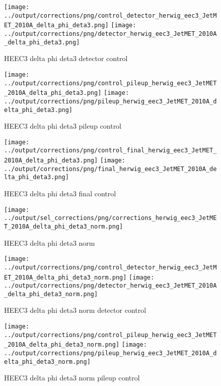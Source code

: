 \documentclass[11pt]{book}
\begin{document}
\begin{figure}[ht]
\centering
\texttt{[image: ../output/corrections/png/control\_detector\_herwig\_eec3\_JetMET\_2010A\_delta\_phi\_deta3.png]}
\texttt{[image: ../output/corrections/png/detector\_herwig\_eec3\_JetMET\_2010A\_delta\_phi\_deta3.png]}
\caption{HEEC3 delta phi deta3 detector control}
\label{fig:HEEC3_JetMET_2010A_delta_phi_deta3_detector_control}
\end{figure}

\begin{figure}[ht]
\centering
\texttt{[image: ../output/corrections/png/control\_pileup\_herwig\_eec3\_JetMET\_2010A\_delta\_phi\_deta3.png]}
\texttt{[image: ../output/corrections/png/pileup\_herwig\_eec3\_JetMET\_2010A\_delta\_phi\_deta3.png]}
\caption{HEEC3 delta phi deta3 pileup control}
\label{fig:HEEC3_JetMET_2010A_delta_phi_deta3_pileup_control}
\end{figure}


\begin{figure}[ht]
\centering
\texttt{[image: ../output/corrections/png/control\_final\_herwig\_eec3\_JetMET\_2010A\_delta\_phi\_deta3.png]}
\texttt{[image: ../output/corrections/png/final\_herwig\_eec3\_JetMET\_2010A\_delta\_phi\_deta3.png]}
\caption{HEEC3 delta phi deta3 final control}
\label{fig:HEEC3_JetMET_2010A_delta_phi_deta3_final_control}
\end{figure}


\begin{figure}[ht]
\centering
\texttt{[image: ../output/sel\_corrections/png/corrections\_herwig\_eec3\_JetMET\_2010A\_delta\_phi\_deta3\_norm.png]}
\caption{HEEC3 delta phi deta3 norm}
\label{fig:HEEC3_JetMET_2010A_delta_phi_deta3_norm}
\end{figure}

\begin{figure}[ht]
\centering
\texttt{[image: ../output/corrections/png/control\_detector\_herwig\_eec3\_JetMET\_2010A\_delta\_phi\_deta3\_norm.png]}
\texttt{[image: ../output/corrections/png/detector\_herwig\_eec3\_JetMET\_2010A\_delta\_phi\_deta3\_norm.png]}
\caption{HEEC3 delta phi deta3 norm detector control}
\label{fig:HEEC3_JetMET_2010A_delta_phi_deta3_norm_detector_control}
\end{figure}

\begin{figure}[ht]
\centering
\texttt{[image: ../output/corrections/png/control\_pileup\_herwig\_eec3\_JetMET\_2010A\_delta\_phi\_deta3\_norm.png]}
\texttt{[image: ../output/corrections/png/pileup\_herwig\_eec3\_JetMET\_2010A\_delta\_phi\_deta3\_norm.png]}
\caption{HEEC3 delta phi deta3 norm pileup control}
\label{fig:HEEC3_JetMET_2010A_delta_phi_deta3_norm_pileup_control}
\end{figure}
\end{document}
